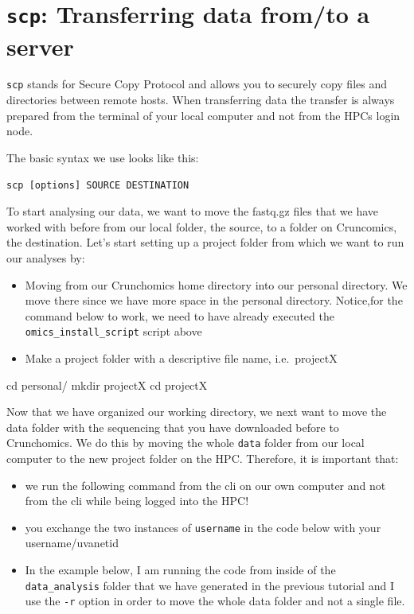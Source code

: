 \documentclass[
  letterpaper,
  DIV=11,
  numbers=noendperiod]{scrreprt}
\newenvironment{Shaded}{}{}
\newcommand{\BuiltInTok}[1]{\textcolor[rgb]{0.84,0.23,0.29}{#1}}
\newcommand{\FunctionTok}[1]{\textcolor[rgb]{0.44,0.26,0.76}{#1}}
\newcommand{\NormalTok}[1]{\textcolor[rgb]{0.14,0.16,0.18}{#1}}
\providecommand{\tightlist}{%
  \setlength{\itemsep}{0pt}\setlength{\parskip}{0pt}}\usepackage{longtable,booktabs,array}
\begin{document}
\section{\texorpdfstring{\texttt{scp}: Transferring data from/to a
server}{scp: Transferring data from/to a server}}\label{scp-transferring-data-fromto-a-server}

\texttt{scp} stands for Secure Copy Protocol and allows you to securely
copy files and directories between remote hosts. When transferring data
the transfer is always prepared from the terminal of your local computer
and not from the HPCs login node.

The basic syntax we use looks like this:

\texttt{scp\ {[}options{]}\ SOURCE\ DESTINATION}

To start analysing our data, we want to move the fastq.gz files that we
have worked with before from our local folder, the source, to a folder
on Cruncomics, the destination. Let's start setting up a project folder
from which we want to run our analyses by:

\begin{itemize}
\tightlist
\item
  Moving from our Crunchomics home directory into our personal
  directory. We move there since we have more space in the personal
  directory. Notice,for the command below to work, we need to have
  already executed the \texttt{omics\_install\_script} script above
\item
  Make a project folder with a descriptive file name, i.e.~projectX
\end{itemize}

\begin{Shaded}
\begin{Highlighting}[]
\BuiltInTok{cd}\NormalTok{ personal/}
\FunctionTok{mkdir}\NormalTok{ projectX}
\BuiltInTok{cd}\NormalTok{ projectX}
\end{Highlighting}
\end{Shaded}

Now that we have organized our working directory, we next want to move
the data folder with the sequencing that you have downloaded before to
Crunchomics. We do this by moving the whole \texttt{data} folder from
our local computer to the new project folder on the HPC. Therefore, it
is important that:

\begin{itemize}
\tightlist
\item
  we run the following command from the cli on our own computer and not
  from the cli while being logged into the HPC!
\item
  you exchange the two instances of \texttt{username} in the code below
  with your username/uvanetid
\item
  In the example below, I am running the code from inside of the
  \texttt{data\_analysis} folder that we have generated in the previous
  tutorial and I use the \texttt{-r} option in order to move the whole
  data folder and not a single file.
\end{itemize}
\end{document}
